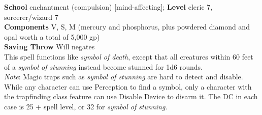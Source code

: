 \textbf{School} enchantment (compulsion) [mind-affecting]; \textbf{Level} cleric 7, sorcerer/wizard 7\\
\textbf{Components} V, S, M (mercury and phosphorus, plus powdered diamond and opal worth a total of 5,000 gp)\\
\textbf{Saving Throw }Will negates\\
This spell functions like \textit{symbol of death}, except that all creatures within 60 feet of a \textit{symbol of stunning }instead become stunned for 1d6 rounds.\\
\textit{Note}: Magic traps such as \textit{symbol of stunning }are hard to detect and disable. While any character can use Perception to find a symbol, only a character with the trapfinding class feature can use Disable Device to disarm it. The DC in each case is 25 + spell level, or 32 for \textit{symbol of stunning}.\\
